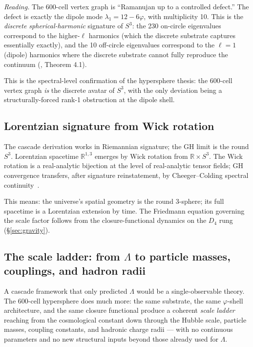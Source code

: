 \documentclass[11pt]{article}
\theoremstyle{plain}
\theoremstyle{definition}
\theoremstyle{remark}
\begin{document}
\noindent\emph{Reading.} The 600-cell vertex graph is ``Ramanujan up to a controlled defect.'' The defect is exactly the dipole mode $\lambda_1 = 12 - 6\varphi$, with multiplicity 10. This is the \emph{discrete spherical-harmonic} signature of $S^3$: the 230 on-circle eigenvalues correspond to the higher-$\ell$ harmonics (which the discrete substrate captures essentially exactly), and the 10 off-circle eigenvalues correspond to the $\ell = 1$ (dipole) harmonics where the discrete substrate cannot fully reproduce the continuum (\citealp{rhTwoSphere}, Theorem 4.1).

This is the spectral-level confirmation of the hypersphere thesis: the 600-cell vertex graph \emph{is} the discrete avatar of $S^3$, with the only deviation being a structurally-forced rank-1 obstruction at the dipole shell.

\subsection{Lorentzian signature from Wick rotation}

The cascade derivation works in Riemannian signature; the GH limit is the round $S^3$. Lorentzian spacetime $\mathbb{R}^{1,3}$ emerges by Wick rotation from $\mathbb{R} \times S^3$. The Wick rotation is a real-analytic bijection at the level of real-analytic tensor fields; GH convergence transfers, after signature reinstatement, by Cheeger--Colding spectral continuity~\citep[F6.6]{SmartXXXVI}.

This means: the universe's spatial geometry is the round 3-sphere; its full spacetime is a Lorentzian extension by time. The Friedmann equation governing the scale factor follows from the closure-functional dynamics on the $D_4$ rung (\S\ref{sec:gravity}).

\subsection{The scale ladder: from $\Lambda$ to particle masses, couplings, and hadron radii}\label{sec:hypersphere-scale-ladder}

A cascade framework that only predicted $\Lambda$ would be a single-observable theory. The 600-cell hypersphere does much more: the same substrate, the same $\varphi$-shell architecture, and the same closure functional produce a coherent \emph{scale ladder} reaching from the cosmological constant down through the Hubble scale, particle masses, coupling constants, and hadronic charge radii --- with no continuous parameters and no new structural inputs beyond those already used for $\Lambda$.
\end{document}
